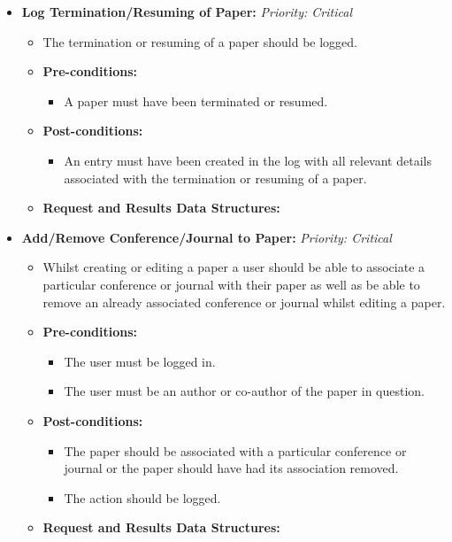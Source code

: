 \documentclass{article}
\begin{document}
\begin{itemize}
					\item \textbf{Log Termination/Resuming of Paper:} \hfill \textit{Priority: Critical}
					\begin{itemize}
						\item The termination or resuming of a paper should be logged.
						\item \textbf{Pre-conditions:}
						\begin{itemize}
							\item A paper must have been terminated or resumed.
						\end{itemize}
						\item \textbf{Post-conditions:}
						\begin{itemize}
							\item An entry must have been created in the log with all relevant details associated with the termination or resuming of a paper.
						\end{itemize}
						\item \textbf{Request and Results Data Structures:}
					\end{itemize}
					
					\item \textbf{Add/Remove Conference/Journal to Paper:} \hfill \textit{Priority: Critical}
					\begin{itemize}
						\item Whilst creating or editing a paper a user should be able to associate a particular conference or journal with their paper as well as be able to remove an already associated conference or journal whilst editing a paper.
						\item \textbf{Pre-conditions:}
						\begin{itemize}
							\item The user must be logged in.
							\item The user must be an author or co-author of the paper in question.
						\end{itemize}
						\item \textbf{Post-conditions:}
						\begin{itemize}
							\item The paper should be associated with a particular conference or journal or the paper should have had its association removed.
							\item The action should be logged.
						\end{itemize}
						\item \textbf{Request and Results Data Structures:}
					\end{itemize}					
					

\end{itemize}
\end{document}
